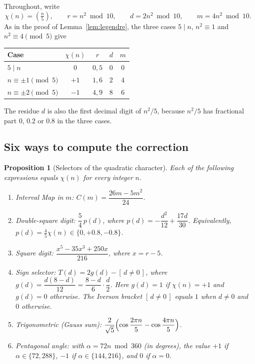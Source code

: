 \documentclass[11pt,a4paper]{article}
\newcommand{\leg}[1]{\left(\tfrac{#1}{5}\right)}      %
\theoremstyle{plain}
\newtheorem{proposition}[theorem]{Proposition}
\theoremstyle{definition}
\theoremstyle{remark}
\begin{document}
Throughout, write
\[
  \chi(n)=\leg{n},\qquad r=n^{2}\bmod 10,\qquad d=2n^{2}\bmod 10,\qquad m=4n^{2}\bmod 10 .
\]
As in the proof of Lemma~\ref{lem:legendre}, the three cases $5\mid n$, $n^{2}\equiv1$ and $n^{2}\equiv4\pmod 5$ give
\begin{center}
\begin{tabular}{@{}lcccc@{}}
\toprule
Case & $\chi(n)$ & $r$ & $d$ & $m$ \\
\midrule
$5\mid n$ & $0$ & $0,5$ & $0$ & $0$ \\
$n\equiv\pm1\pmod5$ & $+1$ & $1,6$ & $2$ & $4$ \\
$n\equiv\pm2\pmod5$ & $-1$ & $4,9$ & $8$ & $6$ \\
\bottomrule
\end{tabular}
\end{center}
The residue $d$ is also the first decimal digit of $n^{2}/5$, because $n^{2}/5$ has fractional part $0$, $0.2$ or $0.8$ in the three cases.

\subsection{Six ways to compute the correction}

\begin{proposition}[Selectors of the quadratic character]\label{prop:selectors}
Each of the following expressions equals $\chi(n)$ for every integer $n$.
\begin{enumerate}[label=(\roman*),itemsep=3pt]
  \item \emph{Interval Map in $m$:} $C(m)=\dfrac{26m-5m^{2}}{24}$.
  \item \emph{Double-square digit:} $\dfrac54\,p(d)$, where $p(d)=-\dfrac{d^{2}}{12}+\dfrac{17d}{30}$. Equivalently, $p(d)=\tfrac45\chi(n)\in\{0,+0.8,-0.8\}$.
  \item \emph{Square digit:} $\dfrac{x^{5}-35x^{3}+250x}{216}$, where $x=r-5$.
  \item \emph{Sign selector:} $T(d)=2g(d)-[\,d\neq0\,]$, where $g(d)=\dfrac{d(8-d)}{12}=\dfrac{8-d}{6}\cdot\dfrac d2$. Here $g(d)=1$ if $\chi(n)=+1$ and $g(d)=0$ otherwise. The Iverson bracket $[\,d\neq0\,]$ equals $1$ when $d\neq0$ and $0$ otherwise.
  \item \emph{Trigonometric (Gauss sum):} $\dfrac{2}{\sqrt5}\Bigl(\cos\dfrac{2\pi n}{5}-\cos\dfrac{4\pi n}{5}\Bigr)$.
  \item \emph{Pentagonal angle:} with $\alpha=72n\bmod 360$ (in degrees), the value $+1$ if $\alpha\in\{72,288\}$, $-1$ if $\alpha\in\{144,216\}$, and $0$ if $\alpha=0$.
\end{enumerate}
\end{proposition}
\end{document}
